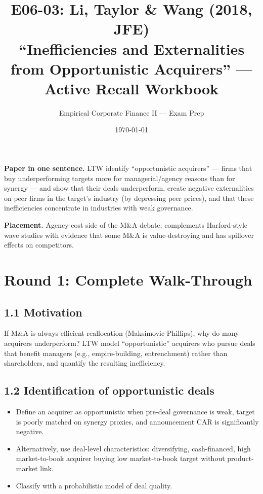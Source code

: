 \documentclass[11pt]{article}
\title{E06-03: Li, Taylor \& Wang (2018, JFE) \\
\large ``Inefficiencies and Externalities from Opportunistic Acquirers'' --- Active Recall Workbook}
\author{Empirical Corporate Finance II --- Exam Prep}
\date{\today}
\begin{document}
\maketitle

\begin{keybox}
\textbf{Paper in one sentence.} LTW identify ``opportunistic acquirers'' --- firms that buy underperforming targets more for managerial/agency reasons than for synergy --- and show that their deals underperform, create negative externalities on peer firms in the target's industry (by depressing peer prices), and that these inefficiencies concentrate in industries with weak governance.

\textbf{Placement.} Agency-cost side of the M\&A debate; complements Harford-style wave studies with evidence that some M\&A is value-destroying and has spillover effects on competitors.
\end{keybox}

\section*{Round 1: Complete Walk-Through}

\subsection*{1.1 Motivation}
If M\&A is always efficient reallocation (Maksimovic-Phillips), why do many acquirers underperform? LTW model ``opportunistic'' acquirers who pursue deals that benefit managers (e.g., empire-building, entrenchment) rather than shareholders, and quantify the resulting inefficiency.

\subsection*{1.2 Identification of opportunistic deals}
\begin{itemize}
\item Define an acquirer as opportunistic when pre-deal governance is weak, target is poorly matched on synergy proxies, and announcement CAR is significantly negative.
\item Alternatively, use deal-level characteristics: diversifying, cash-financed, high market-to-book acquirer buying low market-to-book target without product-market link.
\item Classify with a probabilistic model of deal quality.
\end{itemize}
\end{document}
